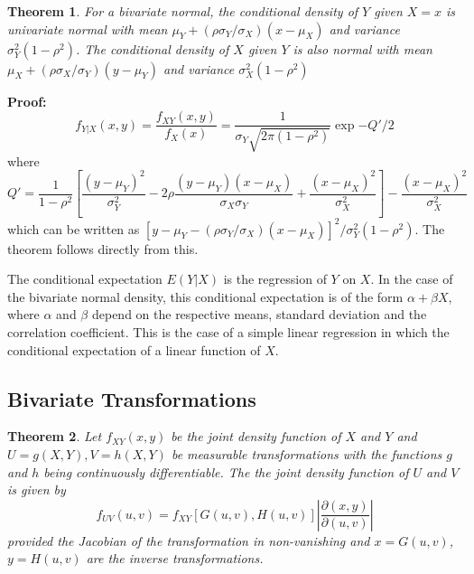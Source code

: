 \documentclass{article}
\newtheorem{theorem}{Theorem}[section]
\begin{document}
\begin{theorem}
    For a bivariate normal, the conditional density of \(Y\) given \(X=x\) is univariate normal with mean \(\mu_Y+(\rho \sigma_Y/\sigma_X)(x-\mu_X)\) and variance \(\sigma_Y^2(1-\rho^2)\). The conditional density of \(X\) given \(Y\) is also normal with mean \(\mu_X+(\rho \sigma_X/\sigma_Y)(y-\mu_Y)\) and variance \(\sigma_X^2(1-\rho^2)\)
\end{theorem}

\textbf{Proof:} \begin{equation*}
    f_{Y|X}(x,y)=\frac{f_{XY}(x,y)}{f_X(x)} = \frac{1}{\sigma_Y \sqrt{2\pi (1-\rho^2)}} \exp{-Q'/2}
    \end{equation*}
where
\begin{equation*}
    Q'=\frac{1}{1-\rho^2} \left[\frac{(y-\mu_Y)^2}{\sigma_Y^2} - 2\rho \frac{(y-\mu_Y)(x-\mu_X)}{\sigma_X \sigma_Y} + \frac{(x-\mu_X)^2}{\sigma_X^2} \right]-\frac{(x-\mu_X)^2}{\sigma_X^2}
\end{equation*}
which can be written as \([y-\mu_Y-(\rho \sigma_Y/\sigma_X)(x-\mu_X)]^2/\sigma_Y^2(1-\rho^2)\). The theorem follows directly from this.

The conditional expectation \(E(Y|X)\) is the regression of \(Y\) on \(X\). In the case of the bivariate normal density, this conditional expectation is of the form \(\alpha+\beta X\), where \(\alpha\) and \(\beta\) depend on the respective means, standard deviation and the correlation coefficient. This is the case of a simple linear regression in which the conditional expectation of a linear function of \(X\).

\subsection{Bivariate Transformations}

\begin{theorem}
    Let \(f_{XY}(x,y)\) be the joint density function of \(X\) and \(Y\) and \(U=g(X,Y), V=h(X,Y)\) be measurable transformations with the functions \(g\) and \(h\) being continuously differentiable. The the joint density function of \(U\) and \(V\) is given by
    \begin{equation*}
        f_{UV}(u,v)=f_{XY}[G(u,v),H(u,v)] \left| \frac{\partial(x,y)}{\partial(u,v)} \right|
    \end{equation*}
    provided the Jacobian of the transformation in non-vanishing and \(x=G(u,v)\), \(y=H(u,v)\) are the inverse transformations.
\end{theorem}
\end{document}
